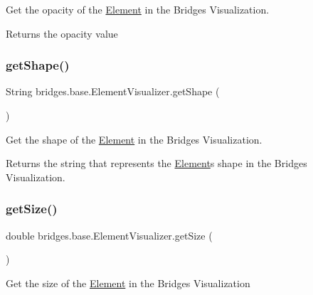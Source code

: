 Get the opacity of the \mbox{\hyperlink{classbridges_1_1base_1_1_element}{Element}} in the Bridges Visualization. 

\begin{DoxyReturn}{Returns}
the opacity value 
\end{DoxyReturn}
\mbox{\label{classbridges_1_1base_1_1_element_visualizer_a8ef0825745e49f32b57e4bf6c891b57e}} 
\subsubsection{\texorpdfstring{get\+Shape()}{getShape()}}
{\footnotesize\ttfamily String bridges.\+base.\+Element\+Visualizer.\+get\+Shape (\begin{DoxyParamCaption}{ }\end{DoxyParamCaption})}

Get the shape of the \mbox{\hyperlink{classbridges_1_1base_1_1_element}{Element}} in the Bridges Visualization.

\begin{DoxyReturn}{Returns}
the string that represents the \mbox{\hyperlink{classbridges_1_1base_1_1_element}{Element}}\textquotesingle{}s shape in the Bridges Visualization. 
\end{DoxyReturn}
\mbox{\label{classbridges_1_1base_1_1_element_visualizer_a0b7673bf724e3df1f94df50ad95ca5b1}} 
\subsubsection{\texorpdfstring{get\+Size()}{getSize()}}
{\footnotesize\ttfamily double bridges.\+base.\+Element\+Visualizer.\+get\+Size (\begin{DoxyParamCaption}{ }\end{DoxyParamCaption})}

Get the size of the \mbox{\hyperlink{classbridges_1_1base_1_1_element}{Element}} in the Bridges Visualization

